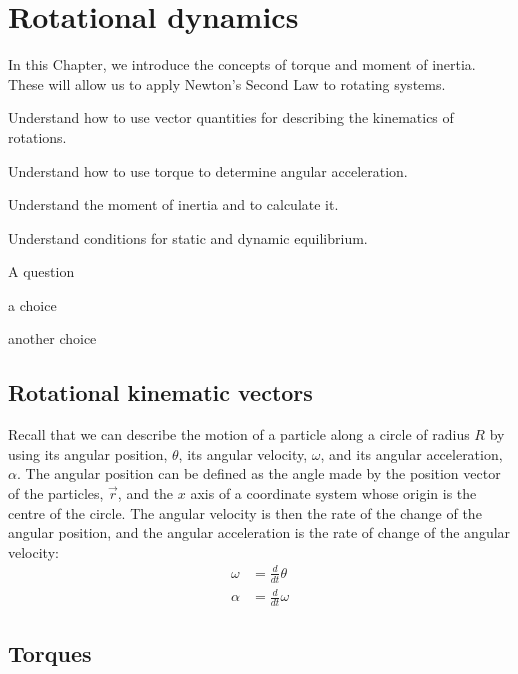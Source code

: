 
\chapter{Rotational dynamics}
\label{chapter:rotationaldynamics}
In this Chapter, we introduce the concepts of torque and moment of inertia. These will allow us to apply Newton's Second Law to rotating systems. 

\begin{learningObjectives}{
 \item Understand how to use vector quantities for describing the kinematics of rotations.
 \item Understand how to use torque to determine angular acceleration.
 \item Understand the moment of inertia and to calculate it.
 \item Understand conditions for static and dynamic equilibrium.
 }
\end{learningObjectives}

\begin{opening}
\begin{MCquestion}{A question}
\item a choice
\item another choice %
\end{MCquestion}
\end{opening}

\section{Rotational kinematic vectors}
Recall that we can describe the motion of a particle along a circle of radius $R$ by using its angular position, $\theta$, its angular velocity, $\omega$, and its angular acceleration, $\alpha$. The angular position can be defined as the angle made by the position vector of the particles, $\vec r$, and the $x$ axis of a coordinate system whose origin is the centre of the circle.  The angular velocity is then the rate of the change of the angular position, and the angular acceleration is the rate of change of the angular velocity:
\begin{align*}
\omega &= \frac{d}{dt}\theta \\
\alpha &= \frac{d}{dt}\omega
\end{align*}

\section{Torques}

